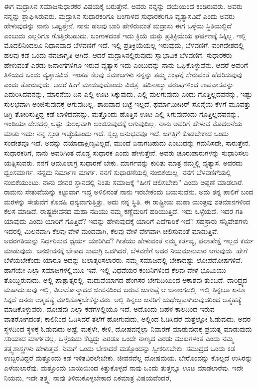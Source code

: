 ಈಗ ಮದ್ರಾಸಿನ ಸಮಾಜಸುಧಾರಕರ ವಿಷಯಕ್ಕೆ ಬರುತ್ತೇನೆ. ಅವರು ನನ್ನನ್ನು ದಯೆಯಿಂದ ಕಂಡಿರುವರು. ಅವರು ನನ್ನನ್ನು ಶ್ಲಾಘಿಸಿರುವರು. ಮದ್ರಾಸಿನ ಸುಧಾರಕರಿಗೂ ಬಂಗಾಳದ ಸುಧಾರಕರಿಗೂ ವ್ಯತ್ಯಾಸವಿದೆ ಎಂದು ಅವರು ಹೇಳುವುದನ್ನು ನಾನು ಒಪ್ಪುತ್ತೇನೆ. ನಾನು ಹಲವು ಬಾರಿ ಹೇಳಿರುವಂತೆ ಮದ್ರಾಸು ಈಗ ಒಳ್ಳೆಯ ಸ್ಥಿತಿಯಲ್ಲಿದೆ ಎಂಬುದು ಎಲ್ಲರಿಗೂ ಗೊತ್ತಿರಬಹುದು. ಬಂಗಾಳದಂತೆ ಇದು ಕ್ರಿಯೆ ಮತ್ತು ಪ್ರತಿಕ್ರಿಯೆಯ ಘರ್ಷಣಕ್ಕೆ ಸಿಕ್ಕಿಲ್ಲ. ಇಲ್ಲಿ ಮೊದಲಿನಿಂದಲೂ ನಿಧಾನವಾದ ಬೆಳವಣಿಗೆ ಇದೆ. ಇಲ್ಲಿ ಪ್ರತಿಕ್ರಿಯೆಯಲ್ಲ ಇರುವುದು, ಬೆಳವಣಿಗೆ. ವಂಗದೇಶದಲ್ಲಿ ಹಲವು ಕಡೆ ಒಂದು ನವಜಾಗೃತಿ ಆಗಿದೆ. ಆದರೆ ಮದ್ರಾಸಿನಲ್ಲಿರುವುದು ಸ್ವಾಭಾವಿಕ ಬೆಳವಣಿಗೆ. ಸುಧಾರಕರು ಹೇಳುವಂತೆ ಎರಡು ಜನಾಂಗಗಳಿಗೂ ಇರುವ ವ್ಯತ್ಯಾಸ ಇದು ಎಂಬುದನ್ನು ನಾನು ಒಪ್ಪಿಕೊಳ್ಳುವೆನು. ಆದರೆ ಅವರಿಗೆ ತಿಳಿಯದ ಒಂದು ವ್ಯತ್ಯಾಸವಿದೆ. ಇಂತಹ ಕೆಲವು ಸಮಾಜಗಳು ನನ್ನನ್ನು ತಮ್ಮ ಸಂಘಕ್ಕೆ ಸೇರುವಂತೆ ಹೆದರಿಸುವುವು ಎಂದು ತೋರುವುದು. ಆದರೆ ಹೀಗೆ ಮಾಡುವುದೊಂದು ವಿಚಿತ್ರ. ಹದಿನಾಲ್ಕು ವರುಷಗಳಿಂದ ಉಪವಾಸವನ್ನು ಎದುರಿಸಿದವನನ್ನು, ಮಾರನೆಯ ದಿನ ಎಲ್ಲಿ ಊಟ ಸಿಕ್ಕುವುದು, ಎಲ್ಲಿ ಮಲಗುವುದು ಎಂದು ಗೊತ್ತಿಲ್ಲದವನನ್ನು, ಇಷ್ಟು ಸುಲಭವಾಗಿ ಅಂಜಿಸುವುದಕ್ಕೆ ಆಗುವುದಿಲ್ಲ. ಶಾಖವಾದ ಬಟ್ಟೆ ಇಲ್ಲದೆ, ಥರ್ಮಾಮೀಟರ್​ ಸೊನ್ನೆಯ ಕೆಳಗೆ ಮೂವತ್ತು ಡಿಗ್ರಿ ತೋರಿಸುತ್ತಿದ್ದ ಕಡೆ ಬಾಳಿದವನನ್ನು, ಮತ್ತೊಂದು ಹೊತ್ತಿನ ಊಟ ಎಲ್ಲಿ ಸಿಗುವುದೆಂದು ಗೊತ್ತಿಲ್ಲದವನನ್ನು, ಇಂಡಿಯಾ ದೇಶದಲ್ಲಿ ಅಷ್ಟು ಸುಲಭವಾಗಿ ಅಂಜಿಸುವುದಕ್ಕೆ ಆಗುವುದಿಲ್ಲ. ನಾನು ಅವರಿಗೆ ಹೇಳುವ ಮೊದಲನೆಯ ಮಾತು ಇದು: ನನ್ನ ಸ್ವಂತ ಇಚ್ಛೆಯೊಂದು ಇದೆ. ಸ್ವಲ್ಪ ಅನುಭವವೂ ಇದೆ. ಜಗತ್ತಿಗೆ ಕೊಡಬೇಕಾದ ಒಂದು ಸಂದೇಶವೂ ಇದೆ. ಅದನ್ನು ದಯಾದಾಕ್ಷಿಣ್ಯವಿಲ್ಲದೆ, ಮುಂದೆ ಏನಾಗಬಹುದು ಎಂಬುದನ್ನು ಗಮನಿಸದೇ, ಸಾರುತ್ತೇನೆ. ಸುಧಾರಕರಿಗೆ, ನಾನು ಅವರಿಗಿಂತ ದೊಡ್ಡ ಸುಧಾರಕ ಎಂದು ಹೇಳುತ್ತೇನೆ. ಅವರು ಚೂರುಪಾರುಗಳನ್ನು ಸುಧಾರಿಸಲು ಯತ್ನಿಸುವರು. ನನಗೆ ಆಮೂಲಾಗ್ರ ಸುಧಾರಣೆ ಬೇಕು. ಮಾರ್ಗವನ್ನು ಕುರಿತು ಮಾತ್ರ ನಮ್ಮಲ್ಲಿ ವ್ಯತ್ಯಾಸ. ಅವರದು ಧ್ವಂಸಮಾರ್ಗ. ನನ್ನದು ನಿರ್ಮಾಣ ಮಾರ್ಗ. ನನಗೆ ಸುಧಾರಣೆಯಲ್ಲಿ ನಂಬಿಕೆಯಿಲ್ಲ. ನನಗೆ ಬೆಳವಣಿಗೆಯಲ್ಲಿ ನಂಬಿಕೆಯುಂಟು. ನಾನು ದೇವರ ಸ್ಥಾನದಲ್ಲಿ ನಿಂತು ಸಮಾಜಕ್ಕೆ “ಹೀಗೆ ಚಲಿಸಬೇಕು” ಎಂದು ಅಪ್ಪಣೆ ಮಾಡಲಾರೆ. ರಾಮನು ಸೇತುವೆಯನ್ನು ಕಟ್ಟುವಾಗ ಇದ್ದ ಅಳಿಲಿನಂತೆ ನಾನು ಇರಬೇಕೆಂದು ಬಯಸುವೆನು. ಅದು ತನ್ನ ಪಾಲಿಗೆ ಬಂದ ಮರಳನ್ನು ಸೇತುವೆಗೆ ಕೊಡಹಿ ಧನ್ಯವಾಗುತ್ತಿತ್ತು. ಅದು ನನ್ನ ಸ್ಥಿತಿ. ಈ ರಾಷ್ಟ್ರೀಯ ಮಹಾ ಯಂತ್ರವು ಶತಮಾನಗಳಿಂದ ಕೆಲಸ ಮಾಡಿದೆ. ರಾಷ್ಟ್ರಜೀವನದ ಮಹಾ ನದಿಯು ನಮ್ಮ ಕಣ್ಣೆದುರಿಗೆ ಹರಿಯುತ್ತಿದೆ. ಇದು ಒಳ್ಳೆಯದೆ. ಇದರ ಗತಿ ಯಾವುದು ಎಂದು ಯಾರಿಗೆ ಗೊತ್ತಿದೆ? ಇದನ್ನು ಹೇಳುವುದಕ್ಕೆ ಯಾರಿಗೆ ಎದೆಗಾರಿಕೆ ಇದೆ? ಸಹಸ್ರಾರು ಸನ್ನಿವೇಶಗಳು ಇದರಲ್ಲಿ ಮಿಲನವಾಗಿ ಕೆಲವು ವೇಳೆ ಮಂದವಾಗಿ, ಕೆಲವು ವೇಳೆ ವೇಗವಾಗಿ ಚಲಿಸುವಂತೆ ಮಾಡುತ್ತಿವೆ. ಅದರಗತಿಯನ್ನು ನಿರ್ಧರಿಸುವ ಧೈರ್ಯ ಯಾರಿಗಿದೆ? ಗೀತೆಯು ಹೇಳುವಂತೆ ನಮ್ಮ ಕರ್ತವ್ಯ, ಫಲಾಪೇಕ್ಷೆ ಇಲ್ಲದೆ ಕರ್ಮ ಮಾಡುವುದು. ಜನಜೀವನಕ್ಕೆ ಬೇಕಾದ ಸಾಮಗ್ರಿ ಒದಗಿದರೆ, ಬೆಳವಣಿಗೆ ಅದರ ನಿಯಮಾನುಸಾರ ಆಗುವುದು. ಹೇಗೆ ಬೆಳೆಯಬೇಕೆಂದು ಯಾರೂ ಅದನ್ನು ಬಲಾತ್ಕರಿಸ\-ಲಾರರು. ನಮ್ಮ ಸಮಾಜದಲ್ಲಿ ಬೇಕಾದಷ್ಟು ಲೋಪದೋಷಗಳಿವೆ. ಹಾಗೆಯೇ ಎಲ್ಲಾ ಸಮಾಜಗಳಲ್ಲಿಯೂ ಇವೆ. ಇಲ್ಲಿ ವಿಧವೆಯರ ಕಂಬನಿಗಳಿಂದ ಕೆಲವು ವೇಳೆ ಭೂಮಿಯು ತೊಯ್ದಿರುವುದು. ಅಲ್ಲಿ ಪಾಶ್ಚಾತ್ಯರಲ್ಲಿ, ಮದುವೆಯಾಗದ ಹೆಂಗಸರ ಬೇಗುದಿಯಿಂದ ಆಕಾಶವು ತುಂಬಿದೆ. ದಾರಿದ್ರ್ಯದ ಮಹಾದುಃಖವು ಇಲ್ಲಿ, ವಿಲಾಸೋನ್ಮಾದದ ಜೀವನದಿಂದ ಬರುವ ಜುಗುಪ್ಸೆ ಆ ಜನಾಂಗದಲ್ಲಿ. ಇಲ್ಲಿ ತಿನ್ನಲೂ ಏನೂ ಸಿಕ್ಕದೆ ಜನರು ಆತ್ಮಹತ್ಯೆ ಮಾಡಿಕೊಳ್ಳಬೇಕೆನ್ನುವರು. ಅಲ್ಲಿ ತಿನ್ನಲು ಜನರಿಗೆ ಯಥೇಚ್ಛವಾಗಿರುವುದರಿಂದ ಆತ್ಮಹತ್ಯೆ ಮಾಡಿಕೊಳ್ಳುವರು. ದೋಷವು ಎಲ್ಲಾ ಕಡೆಗಳಲ್ಲಿಯೂ ಇದೆ. ಅದೊಂದು ಬಹಳ ಕಾಲದಿಂದ ಇರುವ ವಾತರೋಗದಂತೆ; ಕಾಲಿನಿಂದ ಓಡಿಸಿದರೆ ತಲೆಗೆ ಹೋಗುವುದು, ಅಲ್ಲಿಂದ ಓಡಿಸಿದರೆ ಮತ್ತೆಲ್ಲೋ ಓಡುವುದು. ಅದರ ಸ್ಥಳದಿಂದ ಸ್ಥಳಕ್ಕೆ ಓಡುವುದು ಅಷ್ಟೆ. ಮಕ್ಕಳೇ, ಕೇಳಿ, ದೋಷವನ್ನೆಲ್ಲಾ ನಿವಾರಣೆ ಮಾಡುವುದಕ್ಕೆ ಪ್ರಯತ್ನ ಮಾಡುವುದು ಸರಿಯಾದ ಮಾರ್ಗವಲ್ಲ. ಒಳ್ಳೆಯದು ಕೆಟ್ಟದ್ದು ಎರಡೂ ಒಂದೇ ನಾಣ್ಯದ ಎರಡು ಮುಖಗಳಂತೆ ಎಂದು ನಮ್ಮ ತತ್ತ್ವಶಾಸ್ತ್ರಗಳು ಹೇಳುತ್ತವೆ. ನಿಮಗೆ ಒಂದು ಬೇಕಾದರೆ ಮತ್ತೊಂದನ್ನು ಸ್ವೀಕರಿಸಬೇಕು. ಸಮುದ್ರದ ಒಂದು ಕಡೆ ಉಬ್ಬರವಿದ್ದರೆ ಮತ್ತೊಂದು ಕಡೆ ಇಳಿತವಿರಲೇಬೇಕು. ಜೀವನವೆಲ್ಲ ದೋಷಮಯ. ಬೇರೊಂದನ್ನು ಕೊಲ್ಲದೆ ಉಸಿರನ್ನು ಎಳೆಯಲಾರೆವು. ಮತ್ತೊಂದು ಬಾಯಿಯಿಂದ ಕಿತ್ತುಕೊಳ್ಳದೆ ನಾವು ಒಂದು ತುತ್ತನ್ನೂ ಊಟ ಮಾಡಲಾರೆವು. ಇದೇ ನಿಯಮ, ಇದೇ ತತ್ತ್ವ. ನಾವು ತಿಳಿದುಕೊಳ್ಳಬೇಕಾದ ಏಕಮಾತ್ರ ವಿಷಯವೆಂದರೆ, 